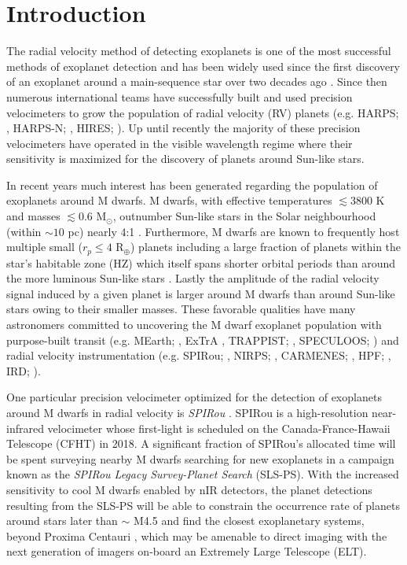 \section{Introduction} 
The radial velocity method of detecting exoplanets is one of the most
successful methods of exoplanet detection
and has been widely used since the first discovery of an
exoplanet around a main-sequence star over two decades ago \citep{mayor95}. 
Since then numerous international teams have successfully built and used
precision velocimeters to grow the population of radial velocity (RV) planets
(e.g. HARPS; \citealt{mayor03}, HARPS-N; \citealt{cosentino12}, HIRES; \citealt{vogt94}).
Up until recently the majority of 
these precision velocimeters have operated in the visible wavelength
regime where their sensitivity is maximized for the discovery of planets
around Sun-like stars. 

In recent years much interest has been generated regarding the population of
exoplanets around M dwarfs. M dwarfs, with effective temperatures
$\lesssim 3800$ K and masses $\lesssim 0.6$ M$_{\odot}$, outnumber Sun-like
stars in the Solar neighbourhood (within $\sim 10$ pc) nearly 4:1
\citep{henry09}. Furthermore, M dwarfs are known to frequently host multiple
small ($r_p \leq 4$ R$_{\oplus}$) planets \citep[e.g.][]{dressing15a, gaidos16}
including a large fraction of planets within the star's habitable zone (HZ)
which itself spans shorter orbital periods than around the more luminous
Sun-like stars \citep{kasting93, kopparapu13}.
Lastly the amplitude of the radial velocity signal induced by a given planet
is larger around M dwarfs than around Sun-like stars owing to their smaller
masses. These favorable qualities have many astronomers 
committed to uncovering the M dwarf exoplanet population with purpose-built
transit (e.g. MEarth; \citealt{irwin15}, ExTrA \citealt{bonfils15},
TRAPPIST; \citealt{gillon11}, SPECULOOS; \citealt{gillon13})
and radial velocity instrumentation (e.g.
SPIRou; \citealt{delfosse13, artigau14}, NIRPS; \citealt{bouchy17}, CARMENES;
\citealt{quirrenbach14}, HPF; \citealt{mahadevan12}, IRD; \citealt{tamura12}).

One particular precision velocimeter optimized for the detection of
exoplanets around M dwarfs in radial velocity is \emph{SPIRou} \citep[Un
  Spectro-Polarim\`{e}tre Infra-Rouge;][]{delfosse13, artigau14}. SPIRou
is a high-resolution near-infrared velocimeter whose first-light is scheduled on
the Canada-France-Hawaii Telescope (CFHT) in 2018. A significant fraction of SPIRou's
allocated time will be spent surveying
nearby M dwarfs searching for new exoplanets in a campaign known as the
\emph{SPIRou Legacy Survey-Planet Search} (SLS-PS). With the increased
sensitivity to cool M dwarfs enabled by nIR detectors, the planet detections
resulting from the
SLS-PS will be able to constrain the occurrence rate of planets around stars
later than $\sim$ M4.5 and find the closest exoplanetary
systems, beyond Proxima Centauri \citep[1.3 pc;][]{angladaescude16}, which
may be amenable to direct imaging with the next generation of imagers on-board
an Extremely Large Telescope (ELT).

